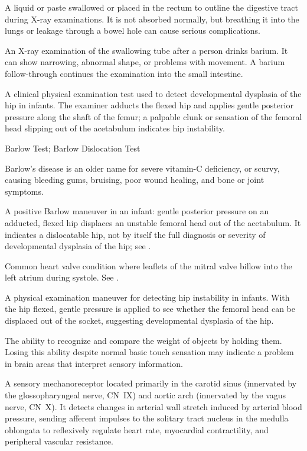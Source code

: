  A liquid or paste swallowed or placed in the rectum to outline the digestive tract during X-ray examinations. It is not absorbed normally, but breathing it into the lungs or leakage through a bowel hole can cause serious complications.

 An X-ray examination of the swallowing tube after a person drinks barium. It can show narrowing, abnormal shape, or problems with movement. A barium follow-through continues the examination into the small intestine.

 A clinical physical examination test used to detect developmental dysplasia of the hip in infants. The examiner adducts the flexed hip and applies gentle posterior pressure along the shaft of the femur; a palpable clunk or sensation of the femoral head slipping out of the acetabulum indicates hip instability.

\synonyms
Barlow Test; Barlow Dislocation Test

 Barlow's disease is an older name for severe vitamin-C deficiency, or scurvy, causing bleeding gums, bruising, poor wound healing, and bone or joint symptoms.

 A positive Barlow maneuver in an infant: gentle posterior pressure on an adducted, flexed hip displaces an unstable femoral head out of the acetabulum. It indicates a dislocatable hip, not by itself the full diagnosis or severity of developmental dysplasia of the hip; see .

 Common heart valve condition where leaflets of the mitral valve billow into the left atrium during systole. See .

 A physical examination maneuver for detecting hip instability in infants. With the hip flexed, gentle pressure is applied to see whether the femoral head can be displaced out of the socket, suggesting developmental dysplasia of the hip.

 The ability to recognize and compare the weight of objects by holding them. Losing this ability despite normal basic touch sensation may indicate a problem in brain areas that interpret sensory information.

 A sensory mechanoreceptor located primarily in the carotid sinus (innervated by the glossopharyngeal nerve, CN~IX) and aortic arch (innervated by the vagus nerve, CN~X). It detects changes in arterial wall stretch induced by arterial blood pressure, sending afferent impulses to the solitary tract nucleus in the medulla oblongata to reflexively regulate heart rate, myocardial contractility, and peripheral vascular resistance.

